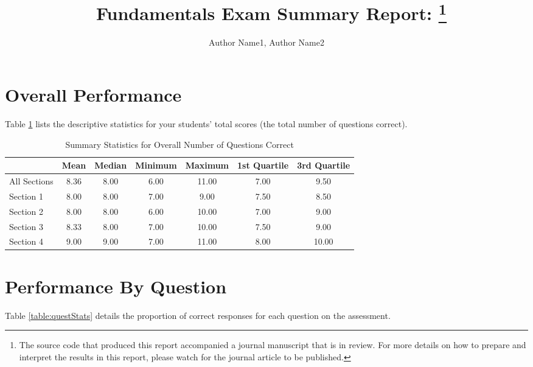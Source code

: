 \documentclass[11pt,letterpaper]{article}\usepackage[]{graphicx}\usepackage[]{color}
\author{Author Name1, Author Name2}
\title{\ClassNumber~Fundamentals Exam Summary Report: \SemYear \thanks{The source code that produced this report accompanied a journal manuscript that is in review.  For more details on how to prepare and interpret the results in this report, please watch for the journal article to be published.}}
\begin{document}
\maketitle










\section*{Overall Performance}
Table \ref{table:summaryStats} lists the descriptive statistics for your students' total scores (the total number of questions correct). 
\begin{table}[ht]
\centering
\caption{Summary Statistics for Overall Number of Questions Correct} 
\label{table:summaryStats}
\begin{tabular}{lcccccc}
  \toprule
 & Mean & Median & Minimum & Maximum & 1st Quartile & 3rd Quartile \\ 
  \midrule
All Sections & 8.36 & 8.00 & 6.00 & 11.00 & 7.00 & 9.50 \\ 
  Section 1 & 8.00 & 8.00 & 7.00 & 9.00 & 7.50 & 8.50 \\ 
  Section 2 & 8.00 & 8.00 & 6.00 & 10.00 & 7.00 & 9.00 \\ 
  Section 3 & 8.33 & 8.00 & 7.00 & 10.00 & 7.50 & 9.00 \\ 
  Section 4 & 9.00 & 9.00 & 7.00 & 11.00 & 8.00 & 10.00 \\ 
   \bottomrule
\end{tabular}
\end{table}

\FloatBarrier

\section*{Performance By Question}
Table \ref{table:questStats} details the proportion of correct responses for each question on the assessment.  

\end{document}
